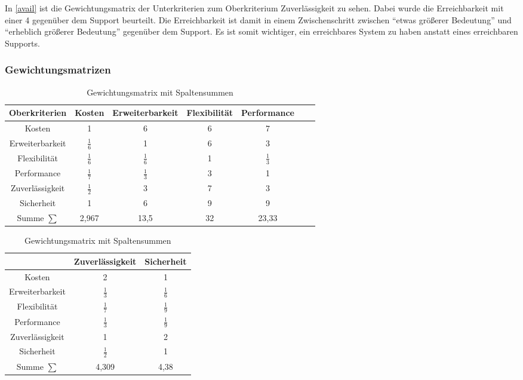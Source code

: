 In \ref{avail} ist die Gewichtungsmatrix der Unterkriterien zum Oberkriterium Zuverlässigkeit zu sehen. Dabei wurde die Erreichbarkeit mit einer 4 gegenüber dem Support beurteilt. Die Erreichbarkeit ist damit in einem Zwischenschritt zwischen \enquote{etwas größerer Bedeutung} und \enquote{erheblich größerer Bedeutung} gegenüber dem Support. Es ist somit wichtiger, ein erreichbares System zu haben anstatt eines erreichbaren Supports.
\subsubsection{Gewichtungsmatrizen}
\begin{table}[h!]
	\centering
	\begin{tabular}{c|cccccc}
		Oberkriterien   & Kosten			 & Erweiterbarkeit & Flexibilität & Performance   \\ 
		\hline
		Kosten          & 1     		      &        6        &       6      &      7      \\
		Erweiterbarkeit &   $\frac{1}{6}$     & 1               &       6      &      3      \\
		Flexibilität    &   $\frac{1}{6}$     &  $\frac{1}{6}$   & 1            &      $\frac{1}{3}$       \\
		Performance     &    $\frac{1}{7}$    &  $\frac{1}{3}$   &        3      & 1           \\
		Zuverlässigkeit &    $\frac{1}{2}$    &          3       &        7      &      3       \\
		Sicherheit      &    1   			  &        6         &        9      &       9       \\
		\hline
		Summe $\sum$    &  		2,967			&		13,5		&		32		&	23,33
	\end{tabular}
	\begin{tabular}{c|cc}
		&	Zuverlässigkeit & Sicherheit  \\ 
		\hline
		Kosten          &        2        &        1    \\
		Erweiterbarkeit &        $\frac{1}{3}$        &       $\frac{1}{6}$      \\
		Flexibilität    &        $\frac{1}{7}$         &      $\frac{1}{9}$       \\
		Performance     &        $\frac{1}{3}$         &      $\frac{1}{9}$       \\
		Zuverlässigkeit & 1               &      2       \\
		Sicherheit      &        $\frac{1}{2}$       & 1       \\
				\hline
		Summe $\sum$    &  		4,309			&   4,38
	\end{tabular}
	\caption{Gewichtungsmatrix mit Spaltensummen}
	\label{allp}
\end{table}
